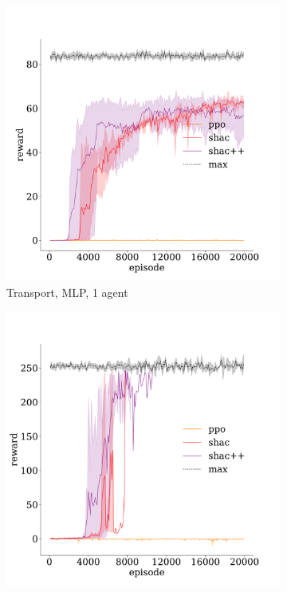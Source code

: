 \begin{figure}[!t]
    \begin{subfigure}[b]{0.30\textwidth}
        \includegraphics[width=\textwidth]{figs/transport-1-mlp.pdf}
        \caption{Transport, MLP, 1 agent}
        \label{fig:transport-mlp-1}
    \end{subfigure}
    \begin{subfigure}[b]{0.30\textwidth}
        \includegraphics[width=\textwidth]{figs/transport-3-transformer.pdf}

\end{subfigure}
\end{figure}
